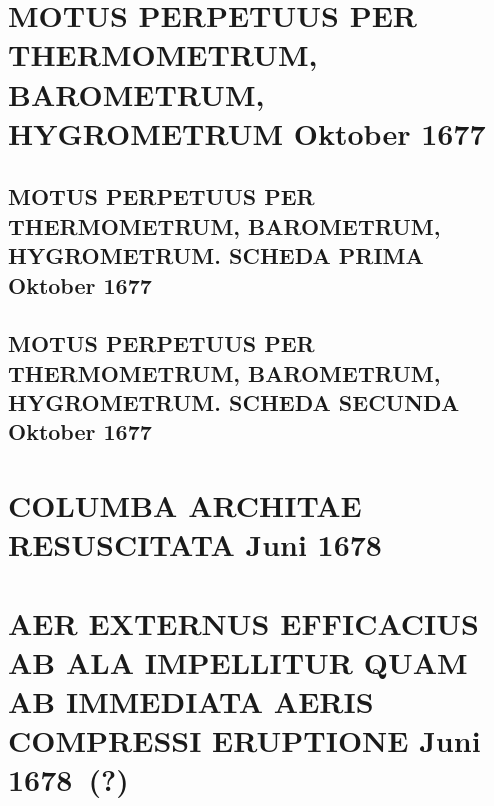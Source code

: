 \documentclass[%
fontsize=10pt,
]{scrbook}
\DeclareRobustCommand{\bracks}[1]{%
\textup{\lbrack}#1\textup{\rbrack}}
\begin{document}
\chapter[tocentry={Motus perpetuus per thermometrum, barometrum, hygrometrum %
\enskip\lbrack Oktober 1677\rbrack},
head={Motus perpetuus%
}]%
{\MakeUppercase{Motus perpetuus per thermometrum, barometrum, hygrometrum}
\newline\lbrack Oktober 1677\rbrack}
\label{motus-perpetuus_intro}



\section[tocentry={Motus perpetuus per thermometrum, barometrum, hygrometrum. Scheda prima 
\enskip Oktober 1677},
head={Motus perpetuus%
. Scheda I}]%
{\MakeUppercase{Motus perpetuus per thermometrum, barometrum, hygrometrum. Scheda prima}
\newline Oktober 1677}
\label{57040}



\section[tocentry={Motus perpetuus per thermometrum, barometrum, hygrometrum. Scheda secunda 
\enskip\lbrack Oktober 1677\rbrack},
head={Motus perpetuus%
. Scheda II}]%
{\MakeUppercase{Motus perpetuus per thermometrum, barometrum, hygrometrum. Scheda secunda}
\newline\lbrack Oktober 1677\rbrack}
\label{57041}




\chapter[tocentry={Columba Architae resuscitata
\enskip Juni 1678},
head={Columba Architae resuscitata}]%
{\MakeUppercase{Columba Architae resuscitata}
\newline Juni 1678}
\label{55774}




\chapter[tocentry={Aer externus efficacius ab ala impellitur quam ab immediata aeris compressi eruptione
\enskip%
\lbrack Juni 1678~(?)\rbrack},
head={Aer externus efficacius ab ala impellitur %
}]%
{\MakeUppercase{Aer externus efficacius ab ala impellitur quam ab immediata aeris compressi eruptione}
\newline%
\bracks{Juni 1678~(?)}%
}
\label{55805}

\end{document}
